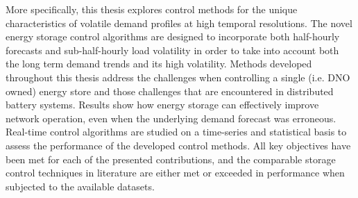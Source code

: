 
More specifically, this thesis explores control methods for the unique characteristics of volatile demand profiles at high temporal resolutions.
The novel energy storage control algorithms are designed to incorporate both half-hourly forecasts and sub-half-hourly load volatility in order to take into account both the long term demand trends and its high volatility.
Methods developed throughout this thesis address the challenges when controlling a single (i.e. DNO owned) energy store and those challenges that are encountered in distributed battery systems.
Results show how energy storage can effectively improve network operation, even when the underlying demand forecast was erroneous.
Real-time control algorithms are studied on a time-series and statistical basis to assess the performance of the developed control methods.
All key objectives have been met for each of the presented contributions, and the comparable storage control techniques in literature are either met or exceeded in performance when subjected to the available datasets.

 